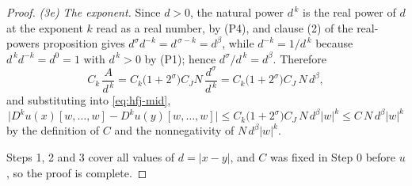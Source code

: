 \begin{proof}
\emph{(3e) The exponent.}  Since $d>0$, the natural power $d^{\,k}$ is the real power of $d$ at
the exponent $k$ read as a real number, by (P4), and clause (2) of the real-powers proposition
gives $d^{\sigma}d^{-k}=d^{\,\sigma-k}=d^{\beta}$, while $d^{-k}=1/d^{\,k}$ because
$d^{\,k}d^{-k}=d^{0}=1$ with $d^{\,k}>0$ by (P1); hence
$d^{\sigma}/d^{\,k}=d^{\beta}$.  Therefore
\[
  C_k\,\frac{A}{d^{\,k}}
  =C_k\bigl(1+2^{\sigma}\bigr)C_JN\,\frac{d^{\sigma}}{d^{\,k}}
  =C_k\bigl(1+2^{\sigma}\bigr)C_J\,N\,d^{\beta},
\]
and substituting into \eqref{eq:hfj-mid},
\[
  \bigl\lvert D^{k}u(x)[w,\ldots,w]-D^{k}u(y)[w,\ldots,w]\bigr\rvert
  \le C_k\bigl(1+2^{\sigma}\bigr)C_J\,N\,d^{\beta}\lvert w\rvert^{k}
  \le C\,N\,d^{\beta}\lvert w\rvert^{k}
\]
by the definition of $C$ and the nonnegativity of $N\,d^{\beta}\lvert w\rvert^{k}$.

\medskip\noindent Steps 1, 2 and 3 cover all values of $d=\lvert x-y\rvert$, and $C$ was fixed
in Step 0 before $u$, so the proof is complete.
\end{proof}
